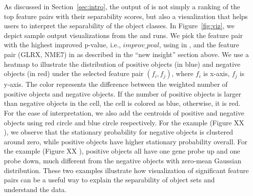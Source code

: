 As discussed in Section~\ref{sec:intro}, the output of \genviz is not simply a ranking of the top feature pairs with their separability scores, but also a visualization that helps users to interpret the separability of the object classes. In Figure~\ref{fig:viz}, we depict sample output visualizations from the \msig and \lincs runs. We pick the feature pair with the highest improved p-value, i.e., $improv\_pval$, using \sampOpt in \msig, and the feature pair (GLRX, NME7) in \lincs as described in the ``new insight'' section  above. We use a heatmap to illustrate the distribution of positive objects (in blue) and negative objects (in red) under the selected feature pair $(f_i,f_j)$, where $f_i$ is x-axis, $f_j$ is y-axis. The color represents the difference between the weighted number of positive objects and negative objects. If the number of positive objects is larger than negative objects in the cell, the cell is colored as blue, otherwise, it is red. For the ease of interpretation, we also add the centroids of positive and negative objects using red circle and blue circle respectively. For the \msig example (Figure XX ), we observe that the stationary probability  for negative objects is clustered around zero, while positive objects have higher stationary probability overall. For the \lincs example (Figure XX ), positive objects all have one gene probe up and one probe down, much different from the negative objects with zero-mean Gaussian distribution.  These two examples illustrate how visualization of significant feature pairs can be a useful way to explain the separability of object sets and understand the data.






